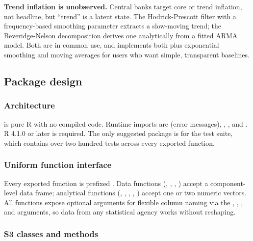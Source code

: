 \textbf{Trend inflation is unobserved.} Central banks target core or
trend inflation, not headline, but ``trend'' is a latent state. The
Hodrick-Prescott filter \citep{hodrick1997postwar} with a
frequency-based smoothing parameter extracts a slow-moving trend; the
Beveridge-Nelson decomposition \citep{beveridge1981new} derives one
analytically from a fitted ARMA model. Both are in common use, and
 implements both plus exponential smoothing and
moving averages for users who want simple, transparent baselines.

\subsection{Package design}\label{package-design}

\subsubsection{Architecture}\label{architecture}

 is pure R with no compiled code. Runtime imports
are  (error messages), , ,
and . R 4.1.0 or later is required. The only suggested
package is  for the test suite, which contains over
two hundred tests across every exported function.

\subsubsection{Uniform function
interface}\label{uniform-function-interface}

Every exported function is prefixed . Data functions
(, , ,
) accept a component-level data frame; analytical
functions (, ,
, , )
accept one or two numeric vectors. All functions expose optional
arguments for flexible column naming via the ,
, , and  arguments,
so data from any statistical agency works without reshaping.

\subsubsection{S3 classes and methods}\label{s3-classes-and-methods}

